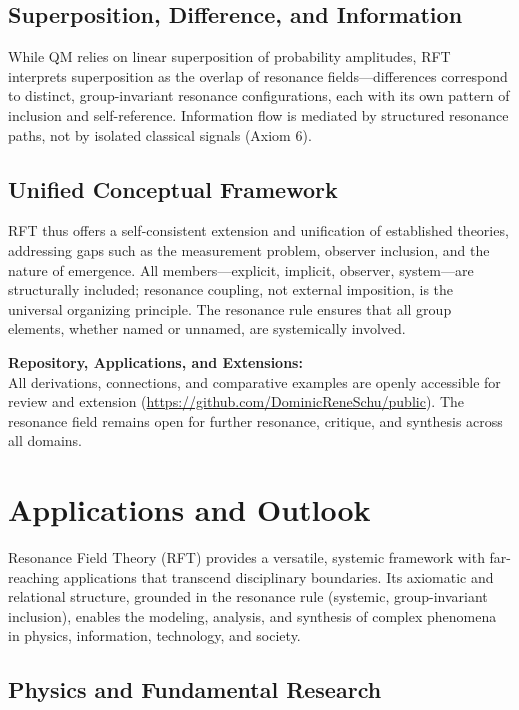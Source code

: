 \documentclass[12pt]{iopart}
\begin{document}
\subsection{Superposition, Difference, and Information}
While QM relies on linear superposition of probability amplitudes, RFT interprets superposition as the overlap of resonance fields—differences correspond to distinct, group-invariant resonance configurations, each with its own pattern of inclusion and self-reference. Information flow is mediated by structured resonance paths, not by isolated classical signals (Axiom 6).

\subsection{Unified Conceptual Framework}
RFT thus offers a self-consistent extension and unification of established theories, addressing gaps such as the measurement problem, observer inclusion, and the nature of emergence. All members—explicit, implicit, observer, system—are structurally included; resonance coupling, not external imposition, is the universal organizing principle. The resonance rule ensures that all group elements, whether named or unnamed, are systemically involved.

\medskip

\textbf{Repository, Applications, and Extensions:}\\
All derivations, connections, and comparative examples are openly accessible for review and extension (\url{https://github.com/DominicReneSchu/public}). The resonance field remains open for further resonance, critique, and synthesis across all domains.

\section{Applications and Outlook}

Resonance Field Theory (RFT) provides a versatile, systemic framework with far-reaching applications that transcend disciplinary boundaries. Its axiomatic and relational structure, grounded in the resonance rule (systemic, group-invariant inclusion), enables the modeling, analysis, and synthesis of complex phenomena in physics, information, technology, and society.

\subsection{Physics and Fundamental Research}
\end{document}
